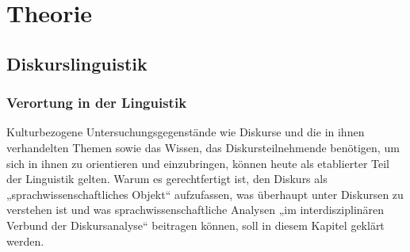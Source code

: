 \chapter{Theorie}\label{theorie}

\section{Diskurslinguistik}\label{diskurslinguistik}

\subsection{Verortung in der Linguistik}\label{verortung-in-der-linguistik}

Kulturbezogene Untersuchungsgegenstände wie Diskurse und die in ihnen verhandelten Themen sowie das Wissen, das Diskursteilnehmende benötigen, um sich in ihnen zu orientieren und einzubringen, können heute als etablierter Teil der Linguistik gelten. Warum es gerechtfertigt ist, den Diskurs als „sprachwissenschaftliches Objekt`` \autocite{busseIstDiskursSprachwissenschaftliches1994} aufzufassen, was überhaupt unter Diskursen zu verstehen ist und was sprachwissenschaftliche Analysen „im interdisziplinären Verbund der Diskursanalyse`` \autocite[10]{spitzmullerDiskurslinguistikEinfuhrungTheorien2011} beitragen können, soll in diesem Kapitel geklärt werden.

